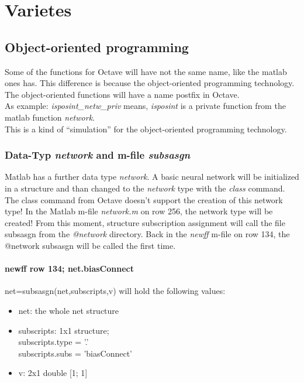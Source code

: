 \section{Varietes}
\label{chap:intro:sec:varietes}
\subsection{Object-oriented programming}
Some of the functions for Octave will have not the same name, like the matlab ones has.
This difference is because the object-oriented programming technology. The object-oriented functions will have a name postfix in Octave.\\
As example: \textit{isposint\_netw\_priv} means, \textit{isposint} is a private function from the matlab function \textit{network}.\\
This is a kind of "`simulation"' for the object-oriented programming technology.\\

\subsubsection{Data-Typ \textit{network} and m-file \textit{subsasgn}}
Matlab has a further data type \textit{network}. A basic neural network will be initialized in a
structure and than changed to the \textit{network} type with the \textit{class} command. The class command from Octave doesn't support the creation of this network type!
In the Matlab m-file \textit{network.m} on row 256, the network type will be created! From this moment, structure subscription assignment will call the file subsasgn from the \textit{@network} directory. Back in the \textit{newff} m-file on row 134, the @network subsasgn will be called the first time.

\paragraph{newff row 134; net.biasConnect} net=subsasgn(net,subscripts,v) will hold the following values:
\begin{itemize}
	\item net: the whole net structure
	\item subscripts: 1x1 structure;\\
		subscripts.type = '.'\\
		subscripts.subs = 'biasConnect'
	\item v: 2x1 double [1; 1]
\end{itemize}

